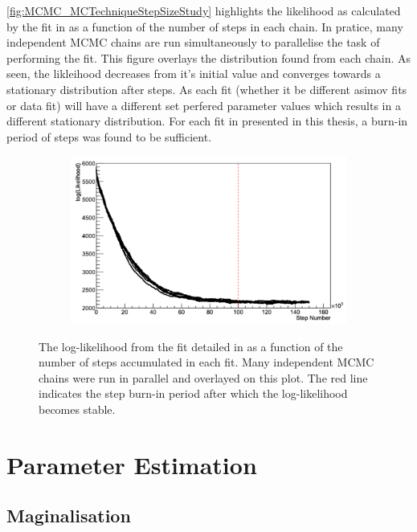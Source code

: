 \autoref{fig:MCMC_MCTechniqueStepSizeStudy} highlights the likelihood as calculated by the fit in  as a function of the number of steps in each chain. In pratice, many independent MCMC chains are run simultaneously to parallelise the task of performing the fit. This figure overlays the distribution found from each chain. As seen, the likleihood decreases from it's initial value and converges towards a stationary distribution after  steps. As each fit (whether it be different asimov fits or data fit) will have a different set perfered parameter values which results in a different stationary distribution. For each fit in presented in this thesis, a burn-in period of  steps was found to be sufficient.

\begin{figure}[h]
  \begin{subfigure}[t]{\textwidth}
    \includegraphics[width=\textwidth, trim={0mm 0mm 0mm 0mm}, clip,page=1]{Figures/MCMC/MCTechnique_LLHStep.pdf}
  \end{subfigure}
  \caption{The log-likelihood from the fit detailed in  as a function of the number of steps accumulated in each fit. Many independent MCMC chains were run in parallel and overlayed on this plot. The red line indicates the  step burn-in period after which the log-likelihood becomes stable.}
  \label{fig:MCMC_MCTechniqueLLHVsStep}
\end{figure}

\section{Parameter Estimation}
\label{sec:MarkovChainMonteCarlo_ParameterEstimation}

\subsection{Maginalisation}
\label{sec:MarkovChainMonteCarlo_Marginalisation}
